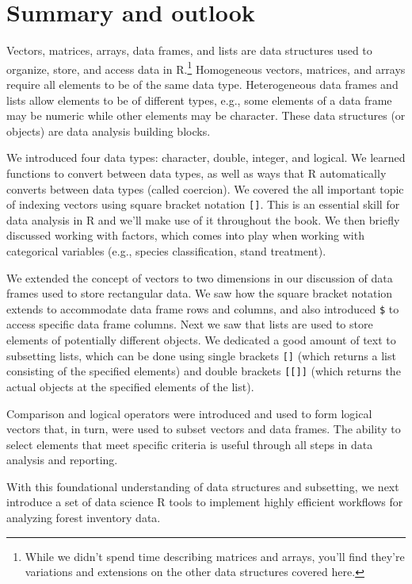 \documentclass[
  11pt,
]{krantz}
\theoremstyle{definition}
\theoremstyle{definition}
\theoremstyle{definition}
\theoremstyle{definition}
\theoremstyle{remark}
\begin{document}
\hypertarget{summaryStructures}{%
\section{Summary and outlook}\label{summaryStructures}}

Vectors, matrices, arrays, data frames, and lists are data structures used to organize, store, and access data in R.\footnote{While we didn't spend time describing matrices and arrays, you'll find they're variations and extensions on the other data structures covered here.} Homogeneous vectors, matrices, and arrays require all elements to be of the same data type. Heterogeneous data frames and lists allow elements to be of different types, e.g., some elements of a data frame may be numeric while other elements may be character. These data structures (or objects) are data analysis building blocks.

We introduced four data types: character, double, integer, and logical. We learned functions to convert between data types, as well as ways that R automatically converts between data types (called coercion). We covered the all important topic of indexing vectors using square bracket notation \texttt{{[}{]}}. This is an essential skill for data analysis in R and we'll make use of it throughout the book. We then briefly discussed working with factors, which comes into play when working with categorical variables (e.g., species classification, stand treatment).

We extended the concept of vectors to two dimensions in our discussion of data frames used to store rectangular data. We saw how the square bracket notation extends to accommodate data frame rows and columns, and also introduced \texttt{\$} to access specific data frame columns. Next we saw that lists are used to store elements of potentially different objects. We dedicated a good amount of text to subsetting lists, which can be done using single brackets \texttt{{[}{]}} (which returns a list consisting of the specified elements) and double brackets \texttt{{[}{[}{]}{]}} (which returns the actual objects at the specified elements of the list).

Comparison and logical operators were introduced and used to form logical vectors that, in turn, were used to subset vectors and data frames. The ability to select elements that meet specific criteria is useful through all steps in data analysis and reporting.

With this foundational understanding of data structures and subsetting, we next introduce a set of data science R tools to implement highly efficient workflows for analyzing forest inventory data.
\end{document}
